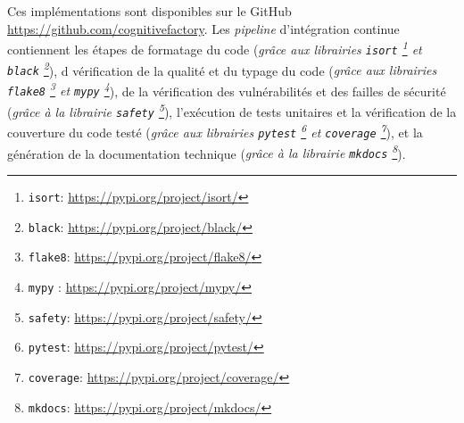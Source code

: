 	\begin{leftBarInformation}
		Ces implémentations sont disponibles sur le GitHub \url{https://github.com/cognitivefactory}.
		Les \textit{pipeline} d'intégration continue contiennent les étapes
		de formatage du code (\textit{grâce aux librairies \texttt{isort} \footnote{
			\texttt{isort}: \url{https://pypi.org/project/isort/}
		} et \texttt{black} \footnote{
			\texttt{black}: \url{https://pypi.org/project/black/}
		}}),
		d vérification de la qualité et du typage du code (\textit{grâce aux librairies \texttt{flake8} \footnote{
			\texttt{flake8}: \url{https://pypi.org/project/flake8/}
		} et \texttt{mypy} \footnote{
			\texttt{mypy} : \url{https://pypi.org/project/mypy/}
		}}),
		de la vérification des vulnérabilités et des failles de sécurité (\textit{grâce à la librairie \texttt{safety} \footnote{
			\texttt{safety}: \url{https://pypi.org/project/safety/}
		}}),
		l'exécution de tests unitaires et la vérification de la couverture du code testé (\textit{grâce aux librairies \texttt{pytest} \footnote{
			\texttt{pytest}: \url{https://pypi.org/project/pytest/}
		} et \texttt{coverage} \footnote{
			\texttt{coverage}: \url{https://pypi.org/project/coverage/}
		}}),
		et la génération de la documentation technique (\textit{grâce à la librairie \texttt{mkdocs} \footnote{
			\texttt{mkdocs}: \url{https://pypi.org/project/mkdocs/}
		}}).
	\end{leftBarInformation}
	
	
	\minitoc
	
	
	
	
	
	\newpage
	
	
	
	\newpage
	
	
	
	\newpage
	